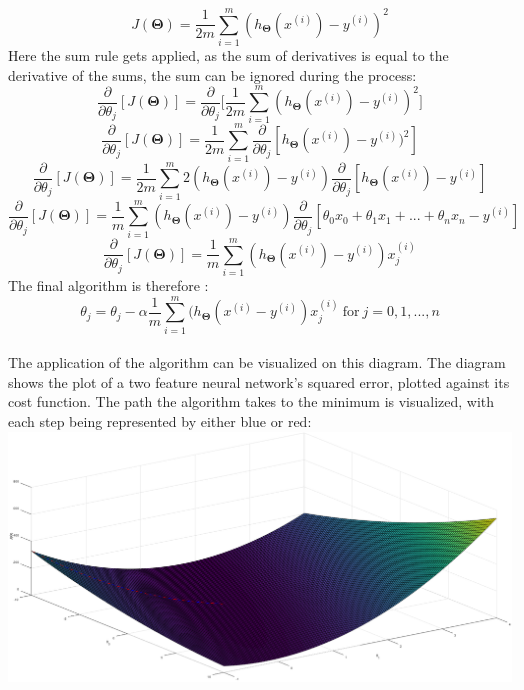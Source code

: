 \documentclass[a4paper,12pt]{article}
\begin{document}
\[J(\boldsymbol{\Theta}) = \frac{1}{2m} \sum_{i=1}^m (h_{\boldsymbol{\Theta}}(x^{(i)}) - y^{(i)})^2\]
Here the sum rule gets applied, as the sum of derivatives is equal to the derivative of the sums, the sum can be ignored during the process:
\[\frac{\partial}{\partial\theta_j} [J(\boldsymbol{\Theta})] = \frac{\partial}{\partial\theta_j} \Big[ \frac{1}{2m} \sum_{i=1}^m (h_{\boldsymbol{\Theta}}(x^{(i)}) - y^{(i)})^2\Big]\]
\[\frac{\partial}{\partial\theta_j} [J(\boldsymbol{\Theta})] = \frac{1}{2m} \sum_{i=1}^m \frac{\partial}{\partial\theta_j} [h_{\boldsymbol{\Theta}}(x^{(i)}) - y^{(i)})^2]\]
\[\frac{\partial}{\partial\theta_j} [J(\boldsymbol{\Theta})] = \frac{1}{2m} \sum_{i=1}^m 2(h_{\boldsymbol{\Theta}}(x^{(i)}) - y^{(i)}) \frac{\partial}{\partial\theta_j}[h_{\boldsymbol{\Theta}}(x^{(i)}) - y^{(i)}]\]
\[\frac{\partial}{\partial\theta_j} [J(\boldsymbol{\Theta})] = \frac{1}{m} \sum_{i=1}^m (h_{\boldsymbol{\Theta}}(x^{(i)}) - y^{(i)})\frac{\partial}{\partial\theta_j} [\theta_0x_0+\theta_1x_1+...+\theta_nx_n-y^{(i)}]\]
\[\frac{\partial}{\partial\theta_j} [J(\boldsymbol{\Theta})] = \frac{1}{m} \sum_{i=1}^m (h_{\boldsymbol{\Theta}}(x^{(i)}) - y^{(i)})x_j^{(i)}\]
The final algorithm is therefore \cite{deeplearning}:
\[\theta_j = \theta_j - \alpha \frac{1}{m} \sum_{i=1}^m (h_{\boldsymbol{\Theta}}(x^{(i)} - y^{(i)})x_j^{(i)} \ \text{for} \ j = 0,1,...,n\]
\\
The application of the algorithm can be visualized on this diagram. The diagram shows the plot of a two feature neural network's squared error, plotted against its cost function. The path the algorithm takes to the minimum is visualized, with each step being represented by either blue or red:
\\
\includegraphics[scale=0.38]{gradientdescent}
\\
\end{document}

